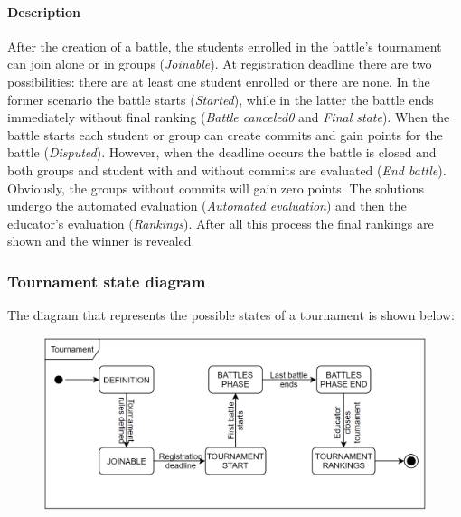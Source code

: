 \documentclass[12pt, a4paper]{report}
\begin{document}
    \paragraph*{Description}
    After the creation of a battle, the students enrolled in the battle's tournament can join alone or in groups (\textit{Joinable}). 
    At registration deadline there are two possibilities: there are at least one student enrolled or there are none. 
    In the former scenario the battle starts (\textit{Started}), while in the latter the battle ends immediately without final ranking (\textit{Battle canceled0} and \textit{Final state}). 
    When the battle starts each student or group can create commits and gain points for the battle (\textit{Disputed}).
    However, when the deadline occurs the battle is closed and both groups and student with and without commits are evaluated (\textit{End battle}). 
    Obviously, the groups without commits will gain zero points. 
    The solutions undergo the automated evaluation (\textit{Automated evaluation}) and then the educator's evaluation (\textit{Rankings}). 
    After all this process the final rankings are shown and the winner is revealed. 

    \subsubsection{Tournament state diagram}
    The diagram that represents the possible states of a tournament is shown below: 
    \begin{figure}[H]
        \centering
        \includegraphics[width=0.75\linewidth]{images/tournament.png}
    \end{figure}
\end{document}
